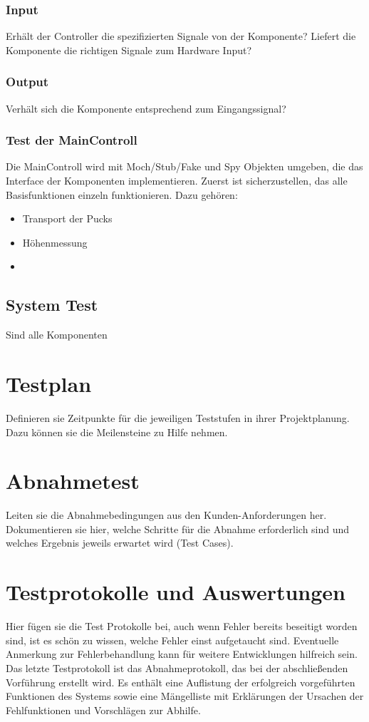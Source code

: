\subsubsection{Input}
Erhält der Controller die spezifizierten Signale von der Komponente? Liefert die Komponente die richtigen Signale zum Hardware Input?

\subsubsection{Output}
Verhält sich die Komponente entsprechend zum Eingangssignal?

\subsubsection{Test der MainControll}
Die MainControll wird mit Moch/Stub/Fake und Spy Objekten umgeben, die das Interface der Komponenten implementieren.
Zuerst ist sicherzustellen, das alle Basisfunktionen einzeln funktionieren. Dazu gehören:
\begin{itemize} 
	\item Transport der Pucks
	\item Höhenmessung
	\item 
\end{itemize}

\subsection{System Test}
Sind alle Komponenten 

\section{Testplan}

Definieren sie Zeitpunkte für die jeweiligen Teststufen in ihrer
Projektplanung. Dazu können sie die Meilensteine zu Hilfe nehmen.

\section{Abnahmetest}

Leiten sie die Abnahmebedingungen aus den Kunden-Anforderungen her.
Dokumentieren sie hier, welche Schritte für die Abnahme erforderlich
sind und welches Ergebnis jeweils erwartet wird (Test Cases).

\section{Testprotokolle und Auswertungen}

Hier fügen sie die Test Protokolle bei, auch wenn Fehler bereits
beseitigt worden sind, ist es schön zu wissen, welche Fehler einst
aufgetaucht sind. Eventuelle Anmerkung zur Fehlerbehandlung kann für
weitere Entwicklungen hilfreich sein.
Das letzte Testprotokoll ist das Abnahmeprotokoll, das bei der
abschließenden Vorführung erstellt wird. Es enthält eine Auflistung der
erfolgreich vorgeführten Funktionen des Systems sowie eine Mängelliste
mit Erklärungen der Ursachen der Fehlfunktionen und Vorschlägen zur
Abhilfe.
